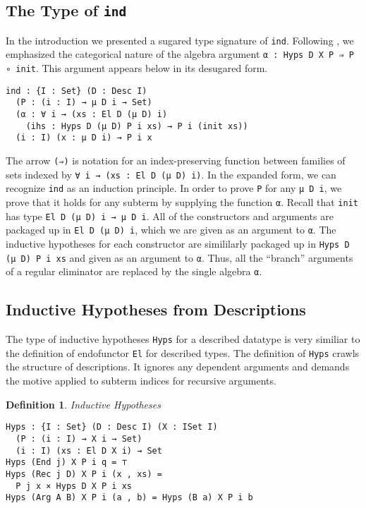 \documentclass[preprint,nonatbib]{sigplanconf}
\newtheorem{definition}{Definition}
\begin{document}
\subsection{The Type of {\tt ind}}

In the introduction we presented a sugared type signature of
{\tt ind}. Following \citet{dagand:phd}, we emphasized
the categorical nature of the algebra argument
{\tt α : Hyps D X P ⇒ P ∘ init}. 
This argument appears below in its desugared form.

\begin{verbatim}
ind : {I : Set} (D : Desc I)
  (P : (i : I) → μ D i → Set)
  (α : ∀ i → (xs : El D (μ D) i)
    (ihs : Hyps D (μ D) P i xs) → P i (init xs))
  (i : I) (x : μ D i) → P i x
\end{verbatim}

The arrow {\tt (⇒)} is notation for an index-preserving function
between families of sets indexed by
{\tt ∀ i → (xs : El D (μ D) i)}.
In the expanded form, we can recognize {\tt ind} as an induction
principle. In order to prove {\tt P} for any {\tt μ D i},
we prove that it holds for any subterm by supplying the function
{\tt α}.
Recall that {\tt init} has type {\tt El D (μ D) i → μ D i}.
All of the constructors and arguments are packaged up in
{\tt El D (μ D) i}, which we are given as an argument to
{\tt α}. The inductive hypotheses for each constructor are simililarly
packaged up in {\tt Hyps D (μ D) P i xs} and given as an argument to 
{\tt α}. Thus, all the ``branch'' arguments of a regular eliminator
are replaced by the single algebra {\tt α}.

\subsection{Inductive Hypotheses from Descriptions}

The type of inductive hypotheses {\tt Hyps} for a described datatype
is very similiar to the definition of endofunctor {\tt El} for
described types. The definition of {\tt Hyps} crawls the structure of
descriptions. It ignores any dependent arguments and demands the
motive applied to subterm indices for recursive arguments.

\begin{definition}\label{def:hyps}
Inductive Hypotheses

\begin{verbatim}
Hyps : {I : Set} (D : Desc I) (X : ISet I)
  (P : (i : I) → X i → Set)
  (i : I) (xs : El D X i) → Set
Hyps (End j) X P i q = ⊤
Hyps (Rec j D) X P i (x , xs) =
  P j x × Hyps D X P i xs
Hyps (Arg A B) X P i (a , b) = Hyps (B a) X P i b
\end{verbatim}

\end{definition}
\end{document}
